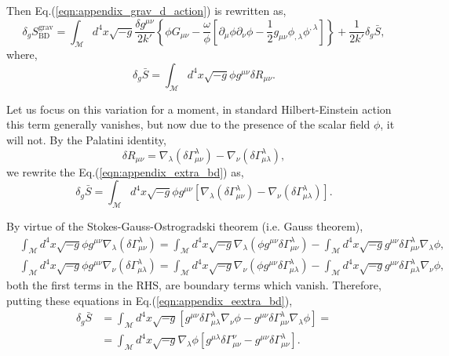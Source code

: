 Then Eq.(\ref{eqn:appendix_grav_d_action}) is rewritten as,
\begin{equation}
\delta_g S_{\mathrm{BD}}^{\mathrm{grav}}=\int_{\mathcal{M}} d^4 x \sqrt{-g} \frac{\delta g^{\mu \nu}}{2k'}\left\{\phi G_{\mu \nu}-\frac{\omega}{\phi}\left[\partial_\mu \phi \partial_\nu \phi-\frac{1}{2}g_{\mu\nu}\phi_{,\lambda}\phi^{,\lambda}\right]\right\}+\frac{1}{2k'}\delta_g \bar{S},
\end{equation}
where,
\begin{equation}
    \delta_g \bar{S}=\int_{\mathcal{M}} d^4 x \sqrt{-g}\phi g^{\mu\nu}\delta R_{\mu\nu}.
    \label{eqn:appendix_extra_bd}
\end{equation}

Let us focus on this variation for a moment, in standard Hilbert-Einstein action this term generally vanishes, but now due to the presence of the scalar field $\phi$, it will not. By the Palatini identity,
\begin{equation}
    \delta R_{\mu\nu}=\nabla_\lambda\left(\delta \Gamma^\lambda_{\mu\nu}\right)-\nabla_\nu\left(\delta \Gamma^\lambda_{\mu\lambda}\right),
\end{equation}
we rewrite the Eq.(\ref{eqn:appendix_extra_bd}) as,
\begin{equation}
    \delta_g \bar{S}=\int_{\mathcal{M}} d^4 x \sqrt{-g}\phi g^{\mu\nu}\left[\nabla_\lambda\left(\delta \Gamma^\lambda_{\mu\nu}\right)-\nabla_\nu\left(\delta \Gamma^\lambda_{\mu\lambda}\right)\right].
    \label{eqn:appendix_eextra_bd}
\end{equation}

By virtue of the Stokes-Gauss-Ostrogradski theorem (i.e. Gauss theorem),
\begin{align}
    &\int_{\mathcal{M}} d^4 x \sqrt{-g}\phi g^{\mu\nu}\nabla_\lambda\left(\delta \Gamma^\lambda_{\mu\nu}\right)=\int_{\mathcal{M}} d^4 x \sqrt{-g} \nabla_\lambda\left(\phi g^{\mu\nu} \delta \Gamma^\lambda_{\mu\nu}\right)-\int_{\mathcal{M}} d^4 x \sqrt{-g}g^{\mu\nu}\delta \Gamma^\lambda_{\mu\nu}\nabla_\lambda\phi,  \\
    &\int_{\mathcal{M}} d^4 x \sqrt{-g}\phi g^{\mu\nu}\nabla_\nu\left(\delta \Gamma^\lambda_{\mu\lambda}\right)=\int_{\mathcal{M}} d^4 x \sqrt{-g} \nabla_\nu\left(\phi g^{\mu\nu} \delta \Gamma^\lambda_{\mu\lambda}\right)-\int_{\mathcal{M}} d^4 x \sqrt{-g}g^{\mu\nu}\delta \Gamma^\lambda_{\mu\lambda}\nabla_\nu\phi,
\end{align}
both the first terms in the RHS, are boundary terms which vanish. Therefore, putting these equations in Eq.(\ref{eqn:appendix_eextra_bd}),
\begin{align}
    \delta_g \bar{S}&=\int_{\mathcal{M}} d^4 x \sqrt{-g}\left[g^{\mu\nu}\delta \Gamma^\lambda_{\mu\lambda}\nabla_\nu\phi-g^{\mu\nu}\delta \Gamma^\lambda_{\mu\nu}\nabla_\lambda\phi\right]=\nonumber\\
    &=\int_{\mathcal{M}} d^4 x \sqrt{-g}\nabla_\lambda\phi\left[g^{\mu\lambda}\delta \Gamma^\nu_{\mu\nu}-g^{\mu\nu}\delta \Gamma^\lambda_{\mu\nu}\right].
    \label{eqn:appendix_eeextra_bd}
\end{align}

